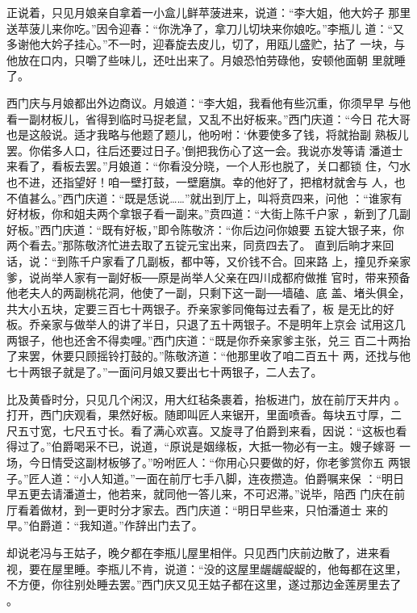 正说着，只见月娘亲自拿着一小盒儿鲜苹菠进来，说道：“李大姐，他大妗子
那里送苹菠儿来你吃。”因令迎春：“你洗净了，拿刀儿切块来你娘吃。”李瓶儿
道：“又多谢他大妗子挂心。”不一时，迎春旋去皮儿，切了，用瓯儿盛贮，拈了
一块，与他放在口内，只嚼了些味儿，还吐出来了。月娘恐怕劳碌他，安顿他面朝
里就睡了。

西门庆与月娘都出外边商议。月娘道：“李大姐，我看他有些沉重，你须早早
与他看一副材板儿，省得到临时马捉老鼠，又乱不出好板来。”西门庆道：“今日
花大哥也是这般说。适才我略与他题了题儿，他吩咐：‘休要使多了钱，将就抬副
熟板儿罢。你偌多人口，往后还要过日子。’倒把我伤心了这一会。我说亦发等请
潘道士来看了，看板去罢。”月娘道：“你看没分晓，一个人形也脱了，关口都锁
住，勺水也不进，还指望好！咱一壁打鼓，一壁磨旗。幸的他好了，把棺材就舍与
人，也不值甚么。”西门庆道：“既是恁说……”就出到厅上，叫将贲四来，问他
：“谁家有好材板，你和姐夫两个拿银子看一副来。”贲四道：“大街上陈千户家
，新到了几副好板。”西门庆道：“既有好板，”即令陈敬济：“你后边问你娘要
五锭大银子来，你两个看去。”那陈敬济忙进去取了五锭元宝出来，同贲四去了。
直到后晌才来回话，说：“到陈千户家看了几副板，都中等，又价钱不合。回来路
上，撞见乔亲家爹，说尚举人家有一副好板──原是尚举人父亲在四川成都府做推
官时，带来预备他老夫人的两副桃花洞，他使了一副，只剩下这一副──墙磕、底
盖、堵头俱全，共大小五块，定要三百七十两银子。乔亲家爹同俺每过去看了，板
是无比的好板。乔亲家与做举人的讲了半日，只退了五十两银子。不是明年上京会
试用这几两银子，他也还舍不得卖哩。”西门庆道：“既是你乔亲家爹主张，兑三
百二十两抬了来罢，休要只顾摇铃打鼓的。”陈敬济道：“他那里收了咱二百五十
两，还找与他七十两银子就是了。”一面问月娘又要出七十两银子，二人去了。

比及黄昏时分，只见几个闲汉，用大红毡条裹着，抬板进门，放在前厅天井内
。打开，西门庆观看，果然好板。随即叫匠人来锯开，里面喷香。每块五寸厚，二
尺五寸宽，七尺五寸长。看了满心欢喜。又旋寻了伯爵到来看，因说：“这板也看
得过了。”伯爵喝采不已，说道，“原说是姻缘板，大抵一物必有一主。嫂子嫁哥
一场，今日情受这副材板够了。”吩咐匠人：“你用心只要做的好，你老爹赏你五
两银子。”匠人道：“小人知道。”一面在前厅七手八脚，连夜攒造。伯爵嘱来保
：“明日早五更去请潘道士，他若来，就同他一答儿来，不可迟滞。”说毕，陪西
门庆在前厅看着做材，到一更时分才家去。西门庆道：“明日早些来，只怕潘道士
来的早。”伯爵道：“我知道。”作辞出门去了。

却说老冯与王姑子，晚夕都在李瓶儿屋里相伴。只见西门庆前边散了，进来看
视，要在屋里睡。李瓶儿不肯，说道：“没的这屋里龌龌龊龊的，他每都在这里，
不方便，你往别处睡去罢。”西门庆又见王姑子都在这里，遂过那边金莲房里去了
。

